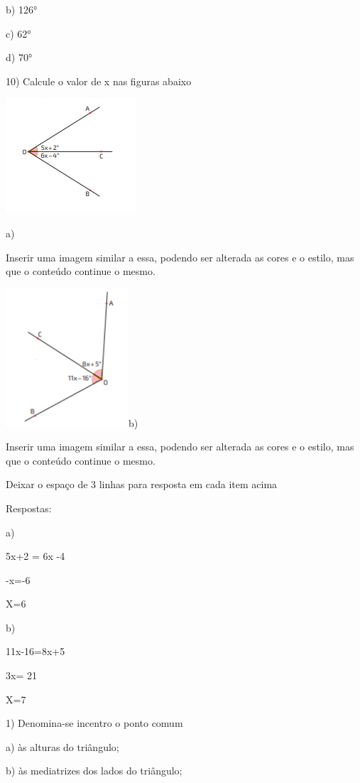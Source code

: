 b) 126°

c) 62°

d) 70°

10) Calcule o valor de x nas figuras abaixo

\includegraphics[width=1.91667in,height=1.6875in]{./imgSAEB_8_MAT/media/image33.png}

a)

Inserir uma imagem similar a essa, podendo ser alterada as cores e o
estilo, mas que o conteúdo continue o mesmo.

\includegraphics[width=1.80208in,height=2.02917in]{./imgSAEB_8_MAT/media/image34.png}b)

Inserir uma imagem similar a essa, podendo ser alterada as cores e o
estilo, mas que o conteúdo continue o mesmo.

Deixar o espaço de 3 linhas para resposta em cada item acima

Respostas:

a)

5x+2 = 6x -4

-x=-6

X=6

b)

11x-16=8x+5

3x= 21

X=7


1) Denomina-se incentro o ponto comum

a) às alturas do triângulo;

b) às mediatrizes dos lados do triângulo;

